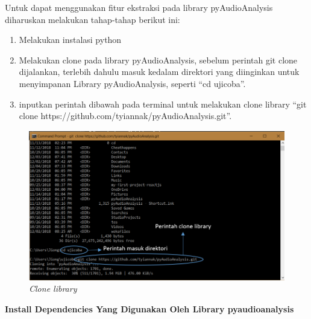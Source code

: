 Untuk dapat menggunakan fitur ekstraksi pada library  pyAudioAnalysis diharuskan melakukan tahap-tahap berikut ini: 
\begin{enumerate}
    \item Melakukan instalasi python
    \item Melakukan clone pada library  pyAudioAnalysis, sebelum perintah git clone dijalankan, terlebih dahulu masuk kedalam direktori yang diinginkan untuk menyimpanan Library  pyAudioAnalysis,  seperti “cd ujicoba”.
    \item inputkan perintah dibawah pada terminal untuk melakukan clone library   “git clone https://github.com/tyiannak/pyAudioAnalysis.git”.
\end{enumerate}
\begin{figure} [htbp]
    \centering
    \includegraphics[scale=0.25] {figures/image009.png}
    \caption{\textit{ Clone library}}
\end{figure}
\par\textbf{Install Dependencies Yang Digunakan Oleh Library  pyaudioanalysis }
